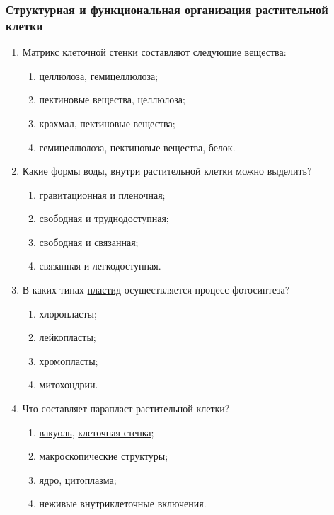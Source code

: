\subsubsection*{Структурная и функциональная организация растительной клетки}

\begin{enumerate}

\item Матрикс \hyperlink{cell_wall}{клеточной стенки} составляют следующие вещества:
\begin{enumerate}[label=\emph{\alph*})]
	\item целлюлоза, гемицеллюлоза;  
	\item пектиновые вещества, целлюлоза;  
	\item крахмал, пектиновые вещества; 
	\item гемицеллюлоза, пектиновые вещества, белок.
\end{enumerate}
	 

\item Какие формы воды, внутри растительной клетки можно выделить?
\begin{enumerate}
	\item гравитационная и пленочная; 
	\item свободная и труднодоступная;  
	\item свободная и связанная;  
	\item связанная и легкодоступная.
\end{enumerate}

\item В каких типах \hyperlink{cell_plastids}{пластид} осуществляется процесс фотосинтеза?
\begin{enumerate}
	\item хлоропласты;  
	\item лейкопласты; 
	\item хромопласты; 
	\item митохондрии. 
\end{enumerate}

\item Что составляет парапласт растительной клетки?
\begin{enumerate}
	\item \hyperlink{cell_vakuol}{вакуоль}, \hyperlink{cell_wall}{клеточная стенка}; 
	\item макроскопические структуры;  
	\item ядро, цитоплазма; 
	\item неживые внутриклеточные включения.
\end{enumerate}


\end{enumerate}
